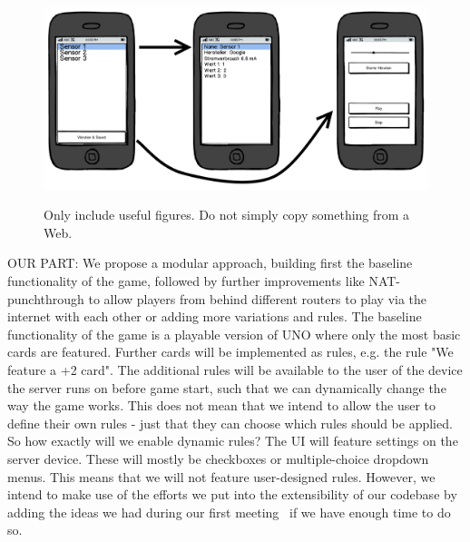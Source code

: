 \documentclass{report}
\newcommand{\lfig}[1]{\label{fig:#1}}
\begin{document}
\begin{figure}[h]
	\centering
    \includegraphics[width=\columnwidth]{example}
    \lfig{example}
    \vspace{-5mm} %
\caption{Only include useful figures. Do not simply copy something from a Web.}
\end{figure}

OUR PART:
We propose a modular approach, building first the baseline functionality of the game, followed by further improvements like NAT-punchthrough to allow players from behind different routers to play via the internet with each other or adding more variations and rules. The baseline functionality of the game is a playable version of UNO where only the most basic cards are featured. Further cards will be implemented as rules, e.g. the rule "We feature a +2 card". The additional rules will be available to the user of the device the server runs on before game start, such that we can dynamically change the way the game works. This does not mean that we intend to allow the user to define their own rules - just that they can choose which rules should be applied.\\
So how exactly will we enable dynamic rules? The UI will feature settings on the server device. These will mostly be checkboxes or multiple-choice dropdown menus. This means that we will not feature user-designed rules. However, we intend to make use of the efforts we put into the extensibility of our codebase by adding the ideas we had during our first meeting~\cite{firstprotocol} if we have enough time to do so.\\
\end{document}
